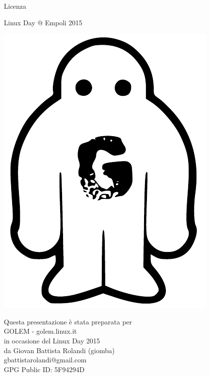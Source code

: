\documentclass{beamer}
\begin{document}
\begin{frame}
\begin{block}{Licenza}
  \end{block}

  \begin{block}{Linux Day @ Empoli 2015}
    \centering
    \begin{minipage}{.1\linewidth}
      \includegraphics[width=.9\linewidth]{img/GOLEM-logo.pdf}
    \end{minipage}
    \begin{minipage}{.7\linewidth}
    \centering
    Questa presentazione è stata preparata per\\
    GOLEM - golem.linux.it\\
    in occasione del Linux Day 2015\\
    da Giovan Battista Rolandi (giomba)\\
    gbattistarolandi@gmail.com\\
    GPG Public ID: 5F94294D
    \end{minipage}
    \begin{minipage}{.1\linewidth}

\end{minipage}
\end{block}
\end{frame}
\end{document}
